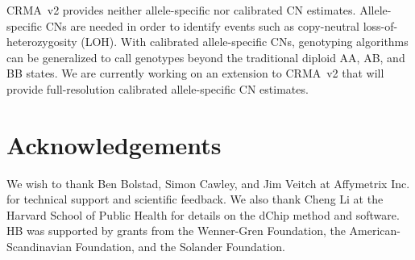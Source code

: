 \documentclass{bioinfo}
\begin{document}
CRMA~v2 provides neither allele-specific nor calibrated CN estimates.  Allele-specific CNs are needed in order to identify events such as copy-neutral loss-of-heterozygosity (LOH).  With calibrated allele-specific CNs, genotyping algorithms can be generalized to call genotypes beyond the traditional diploid AA, AB, and BB states.  We are currently working on an extension to CRMA~v2 that will provide full-resolution calibrated allele-specific CN estimates.

  

    

    

\section*{Acknowledgements}
We wish to thank Ben Bolstad, Simon Cawley, and Jim Veitch at Affymetrix Inc. for technical support and scientific feedback.
We also thank Cheng Li at the Harvard School of Public Health for details on the dChip method and software.
HB was supported by grants from the Wenner-Gren Foundation, the American-Scandinavian Foundation, and the Solander Foundation.\\[1ex]





 
\end{document}
